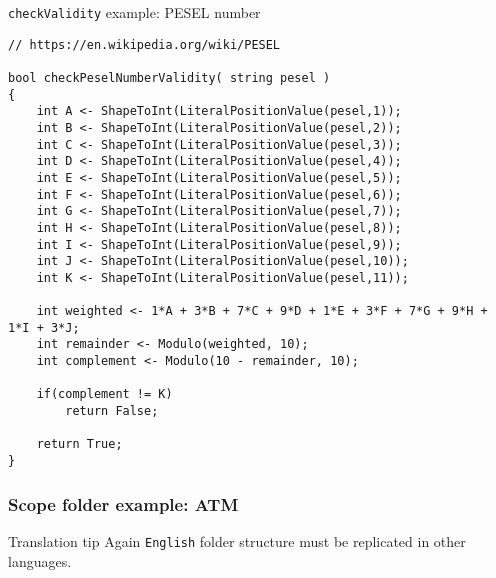 \documentclass[11pt]{beamer}
\begin{document}
\begin{frame}[fragile]
	\begin{block}{\texttt{checkValidity} example: PESEL number}
		\tiny
		\begin{lstlisting}[language=lekta]
// https://en.wikipedia.org/wiki/PESEL

bool checkPeselNumberValidity( string pesel )
{
	int A <- ShapeToInt(LiteralPositionValue(pesel,1));
	int B <- ShapeToInt(LiteralPositionValue(pesel,2));
	int C <- ShapeToInt(LiteralPositionValue(pesel,3));
	int D <- ShapeToInt(LiteralPositionValue(pesel,4));
	int E <- ShapeToInt(LiteralPositionValue(pesel,5));
	int F <- ShapeToInt(LiteralPositionValue(pesel,6));
	int G <- ShapeToInt(LiteralPositionValue(pesel,7));
	int H <- ShapeToInt(LiteralPositionValue(pesel,8));
	int I <- ShapeToInt(LiteralPositionValue(pesel,9));
	int J <- ShapeToInt(LiteralPositionValue(pesel,10));
	int K <- ShapeToInt(LiteralPositionValue(pesel,11));

	int weighted <- 1*A + 3*B + 7*C + 9*D + 1*E + 3*F + 7*G + 9*H + 1*I + 3*J;
	int remainder <- Modulo(weighted, 10);
	int complement <- Modulo(10 - remainder, 10);

	if(complement != K)	
		return False;
	
	return True;
}
		\end{lstlisting}
	\end{block}
\end{frame}

\begin{frame}
\frametitle{Scope folder example: ATM}
	\pause
	\vspace{10pt}
	\begin{block}{Translation tip}
		Again \texttt{English} folder structure must be replicated in other languages.
	\end{block}
\end{frame}
\end{document}
